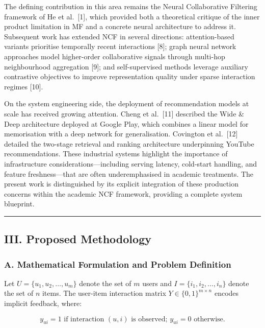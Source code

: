 \documentclass[
]{IEEEtran}
\begin{document}
The defining contribution in this area remains the Neural Collaborative
Filtering framework of He et al.~{[}1{]}, which provided both a
theoretical critique of the inner product limitation in MF and a
concrete neural architecture to address it. Subsequent work has extended
NCF in several directions: attention-based variants prioritise
temporally recent interactions {[}8{]}; graph neural network approaches
model higher-order collaborative signals through multi-hop neighbourhood
aggregation {[}9{]}; and self-supervised methods leverage auxiliary
contrastive objectives to improve representation quality under sparse
interaction regimes {[}10{]}.

On the system engineering side, the deployment of recommendation models
at scale has received growing attention. Cheng et al.~{[}11{]} described
the Wide \& Deep architecture deployed at Google Play, which combines a
linear model for memorisation with a deep network for generalisation.
Covington et al.~{[}12{]} detailed the two-stage retrieval and ranking
architecture underpinning YouTube recommendations. These industrial
systems highlight the importance of infrastructure
considerations---including serving latency, cold-start handling, and
feature freshness---that are often underemphasised in academic
treatments. The present work is distinguished by its explicit
integration of these production concerns within the academic NCF
framework, providing a complete system blueprint.

\begin{center}\rule{0.5\linewidth}{0.5pt}\end{center}

\subsection{III. Proposed Methodology}\label{iii.-proposed-methodology}

\subsubsection{A. Mathematical Formulation and Problem
Definition}\label{a.-mathematical-formulation-and-problem-definition}

Let \(U = \{u_1, u_2, \dots, u_m\}\) denote the set of \(m\) users and
\(I = \{i_1, i_2, \dots, i_n\}\) denote the set of \(n\) items. The
user-item interaction matrix \(Y \in \{0, 1\}^{m \times n}\) encodes
implicit feedback, where:

\[y_{ui} = 1 \text{ if interaction } (u,i) \text{ is observed; } y_{ui} = 0 \text{ otherwise.}\]
\end{document}
